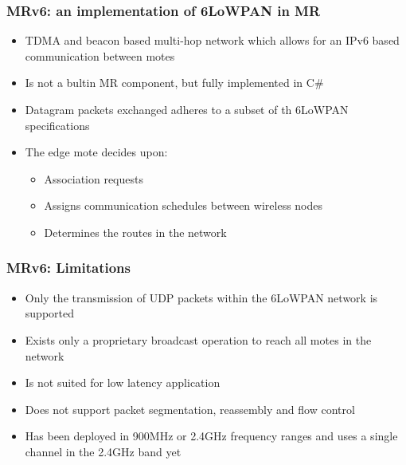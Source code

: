 \begin{frame}[fragile]
  \frametitle{MRv6: an implementation of 6LoWPAN in MR}
  \begin{itemize}
    \item TDMA and beacon based multi-hop network which allows for an IPv6 based communication between motes
    \item Is not a bultin MR component, but fully implemented in C#
    \item Datagram packets exchanged adheres to a subset of th 6LoWPAN specifications
    \item The edge mote decides upon:
    \begin{itemize}
      \item Association requests
      \item Assigns communication schedules between wireless nodes
      \item Determines the routes in the network
    \end{itemize}
  \end{itemize}
\end{frame}

\begin{frame}[fragile]
  \frametitle{MRv6: Limitations}
  \begin{itemize}
    \item Only the transmission of UDP packets within the 6LoWPAN network is supported
    \item Exists only a proprietary broadcast operation to reach all motes in the network
    \item Is not suited for low latency application
    \item Does not support packet segmentation, reassembly and flow control
    \item Has been deployed in 900MHz or 2.4GHz frequency ranges and uses a single channel in the 2.4GHz band yet
  \end{itemize}
\end{frame}

